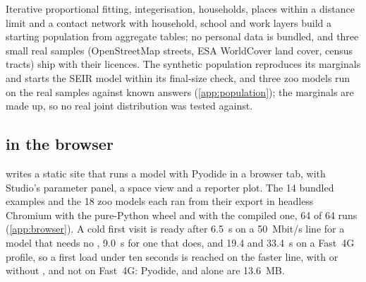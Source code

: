 Iterative proportional fitting, integerisation, households, places within a distance limit and
a contact network with household, school and work layers build a starting population from
aggregate tables; no personal data is bundled, and three small real samples (OpenStreetMap
streets, ESA WorldCover land cover, census tracts) ship with their licences. The synthetic
population reproduces its marginals and starts the SEIR model within its final-size check, and
three zoo models run on the real samples against known answers (\cref{app:population}); the
marginals are made up, so no real joint distribution was tested against.

\subsection{\modelly{} in the browser}
\label{sec:browser}

 writes a static site that runs a model with Pyodide in a browser tab,
with Studio's parameter panel, a space view and a reporter plot. The 14 bundled examples
and the 18 zoo models each ran from their export in headless Chromium with the
pure-Python wheel and with the compiled one, 64 of 64 runs (\cref{app:browser}). A cold first
visit is ready after 6.5~s on a 50~Mbit/s line for a model that needs no , 9.0~s
for one that does, and 19.4 and 33.4~s on a Fast~4G profile, so a first load under ten
seconds is reached on the faster line, with or without , and not on Fast~4G: Pyodide, 
and  alone are 13.6~MB.
